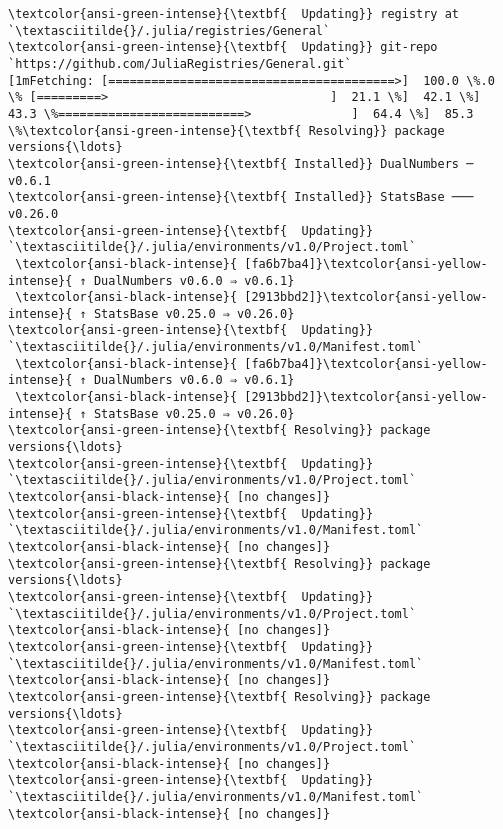 \documentclass[11pt]{article}
\begin{document}
    \begin{Verbatim}[commandchars=\\\{\}]
\textcolor{ansi-green-intense}{\textbf{  Updating}} registry at `\textasciitilde{}/.julia/registries/General`
\textcolor{ansi-green-intense}{\textbf{  Updating}} git-repo `https://github.com/JuliaRegistries/General.git`
[1mFetching: [========================================>]  100.0 \%.0 \% [=========>                               ]  21.1 \%]  42.1 \%]  43.3 \%==========================>              ]  64.4 \%]  85.3 \%\textcolor{ansi-green-intense}{\textbf{ Resolving}} package versions{\ldots}
\textcolor{ansi-green-intense}{\textbf{ Installed}} DualNumbers ─ v0.6.1
\textcolor{ansi-green-intense}{\textbf{ Installed}} StatsBase ─── v0.26.0
\textcolor{ansi-green-intense}{\textbf{  Updating}} `\textasciitilde{}/.julia/environments/v1.0/Project.toml`
 \textcolor{ansi-black-intense}{ [fa6b7ba4]}\textcolor{ansi-yellow-intense}{ ↑ DualNumbers v0.6.0 ⇒ v0.6.1}
 \textcolor{ansi-black-intense}{ [2913bbd2]}\textcolor{ansi-yellow-intense}{ ↑ StatsBase v0.25.0 ⇒ v0.26.0}
\textcolor{ansi-green-intense}{\textbf{  Updating}} `\textasciitilde{}/.julia/environments/v1.0/Manifest.toml`
 \textcolor{ansi-black-intense}{ [fa6b7ba4]}\textcolor{ansi-yellow-intense}{ ↑ DualNumbers v0.6.0 ⇒ v0.6.1}
 \textcolor{ansi-black-intense}{ [2913bbd2]}\textcolor{ansi-yellow-intense}{ ↑ StatsBase v0.25.0 ⇒ v0.26.0}
\textcolor{ansi-green-intense}{\textbf{ Resolving}} package versions{\ldots}
\textcolor{ansi-green-intense}{\textbf{  Updating}} `\textasciitilde{}/.julia/environments/v1.0/Project.toml`
\textcolor{ansi-black-intense}{ [no changes]}
\textcolor{ansi-green-intense}{\textbf{  Updating}} `\textasciitilde{}/.julia/environments/v1.0/Manifest.toml`
\textcolor{ansi-black-intense}{ [no changes]}
\textcolor{ansi-green-intense}{\textbf{ Resolving}} package versions{\ldots}
\textcolor{ansi-green-intense}{\textbf{  Updating}} `\textasciitilde{}/.julia/environments/v1.0/Project.toml`
\textcolor{ansi-black-intense}{ [no changes]}
\textcolor{ansi-green-intense}{\textbf{  Updating}} `\textasciitilde{}/.julia/environments/v1.0/Manifest.toml`
\textcolor{ansi-black-intense}{ [no changes]}
\textcolor{ansi-green-intense}{\textbf{ Resolving}} package versions{\ldots}
\textcolor{ansi-green-intense}{\textbf{  Updating}} `\textasciitilde{}/.julia/environments/v1.0/Project.toml`
\textcolor{ansi-black-intense}{ [no changes]}
\textcolor{ansi-green-intense}{\textbf{  Updating}} `\textasciitilde{}/.julia/environments/v1.0/Manifest.toml`
\textcolor{ansi-black-intense}{ [no changes]}

    \end{Verbatim}
\end{document}
